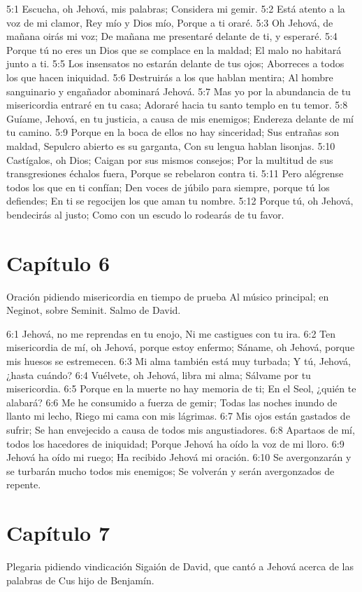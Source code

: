 5:1 Escucha, oh Jehová, mis palabras; 
Considera mi gemir. 
5:2 Está atento a la voz de mi clamor, Rey mío y Dios mío, 
Porque a ti oraré. 
5:3 Oh Jehová, de mañana oirás mi voz; 
De mañana me presentaré delante de ti, y esperaré. 
5:4 Porque tú no eres un Dios que se complace en la maldad; 
El malo no habitará junto a ti. 
5:5 Los insensatos no estarán delante de tus ojos; 
Aborreces a todos los que hacen iniquidad. 
5:6 Destruirás a los que hablan mentira; 
Al hombre sanguinario y engañador abominará Jehová. 
5:7 Mas yo por la abundancia de tu misericordia entraré en tu casa; 
Adoraré hacia tu santo templo en tu temor. 
5:8 Guíame, Jehová, en tu justicia, a causa de mis enemigos; 
Endereza delante de mí tu camino. 
5:9 Porque en la boca de ellos no hay sinceridad; 
Sus entrañas son maldad, 
Sepulcro abierto es su garganta, 
Con su lengua hablan lisonjas. 
5:10 Castígalos, oh Dios; 
Caigan por sus mismos consejos; 
Por la multitud de sus transgresiones échalos fuera, 
Porque se rebelaron contra ti. 
5:11 Pero alégrense todos los que en ti confían; 
Den voces de júbilo para siempre, porque tú los defiendes; 
En ti se regocijen los que aman tu nombre. 
5:12 Porque tú, oh Jehová, bendecirás al justo; 
Como con un escudo lo rodearás de tu favor. 
\section*{Capítulo 6}
Oración pidiendo misericordia en tiempo de prueba 
Al músico principal; en Neginot, sobre Seminit. Salmo de David. 

6:1 Jehová, no me reprendas en tu enojo, 
Ni me castigues con tu ira. 
6:2 Ten misericordia de mí, oh Jehová, porque estoy enfermo; 
Sáname, oh Jehová, porque mis huesos se estremecen. 
6:3 Mi alma también está muy turbada; 
Y tú, Jehová, ¿hasta cuándo? 
6:4 Vuélvete, oh Jehová, libra mi alma; 
Sálvame por tu misericordia. 
6:5 Porque en la muerte no hay memoria de ti; 
En el Seol, ¿quién te alabará? 
6:6 Me he consumido a fuerza de gemir; 
Todas las noches inundo de llanto mi lecho, 
Riego mi cama con mis lágrimas. 
6:7 Mis ojos están gastados de sufrir; 
Se han envejecido a causa de todos mis angustiadores. 
6:8 Apartaos de mí, todos los hacedores de iniquidad; 
Porque Jehová ha oído la voz de mi lloro. 
6:9 Jehová ha oído mi ruego; 
Ha recibido Jehová mi oración. 
6:10 Se avergonzarán y se turbarán mucho todos mis enemigos; 
Se volverán y serán avergonzados de repente. 
\section*{Capítulo 7}
Plegaria pidiendo vindicación 
Sigaión de David, que cantó a Jehová acerca de las palabras de Cus hijo de Benjamín. 

